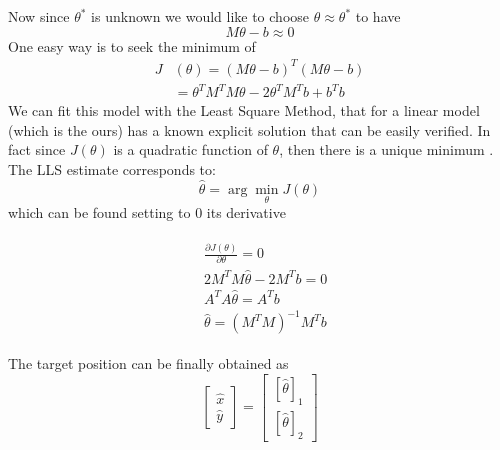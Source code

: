 \documentclass[12pt,twoside]{report}
\begin{document}
Now since $\theta^*$ is unknown we would like to choose $\theta\approx\theta^*$ to have 
\begin{equation}
    M\theta-b\approx0
\end{equation}
One easy way is to seek the minimum of 
\begin{align}
    J&(\theta)=(M\theta - b)^T(M\theta - b)\\
    &=\theta^TM^TM\theta-2\theta^TM^Tb+b^Tb
\end{align}
We can fit this model with the Least Square Method, that for a linear model (which is the ours) has a known explicit solution \cite{10.5555/1557273} that can be easily verified. In fact since $J(\theta)$ is a quadratic function of $\theta$, then there is a unique minimum \cite{Ortega1987,rzk}. The LLS estimate corresponds to:
\begin{equation}
    \hat{\theta}=\arg \min_\theta J(\theta)
\end{equation}
which can be found setting to $0$ its derivative
    
\begin{align}
\begin{split}
&\frac{\partial J(\theta)}{\partial \theta}=0\\
    &2M^TM\hat{\theta}-2M^Tb=0\\
    &A^TA\hat{\theta}=A^Tb\\
    &\hat{\theta}=(M^TM)^{-1}M^Tb
\end{split}
\end{align}


The target position can be finally obtained as 
\begin{equation}
\begin{bmatrix}
    \hat{x}\\
    \hat{y}
\end{bmatrix}=
\begin{bmatrix}
    [\hat{\theta}]_1\\
    [\hat{\theta}]_2
\end{bmatrix}
\end{equation}
\clearpage
\end{document}
